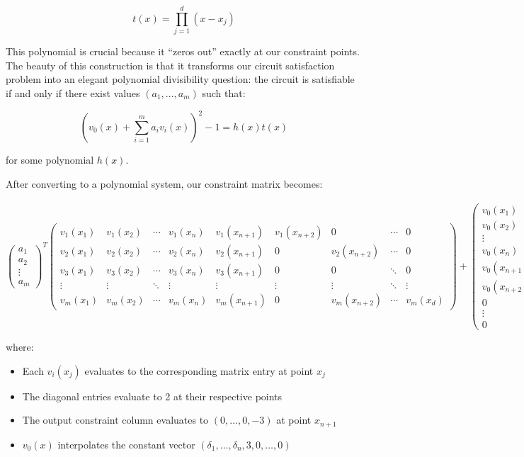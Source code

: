 \documentclass[12pt]{tufte-book}
\begin{document}
\[ t(x) = \prod_{j=1}^d (x-x_j) \]

This polynomial is crucial because it ``zeros out'' exactly at our constraint points. The beauty of this construction is that it transforms our circuit satisfaction problem into an elegant polynomial divisibility question: the circuit is satisfiable if and only if there exist values $(a_1,\ldots,a_m)$ such that:

\[ \left(v_0(x) + \sum_{i=1}^m a_i v_i(x)\right)^2 - 1 = h(x)t(x) \]

for some polynomial $h(x)$.

After converting to a polynomial system, our constraint matrix becomes:

\[ \begin{pmatrix} 
a_1 \\ 
a_2 \\ 
\vdots \\ 
a_m 
\end{pmatrix}^T
\begin{pmatrix}
v_1(x_1) & v_1(x_2) & \cdots & v_1(x_n) & v_1(x_{n+1}) & v_1(x_{n+2}) & 0 & \cdots & 0 \\
v_2(x_1) & v_2(x_2) & \cdots & v_2(x_n) & v_2(x_{n+1}) & 0 & v_2(x_{n+2}) & \cdots & 0 \\
v_3(x_1) & v_3(x_2) & \cdots & v_3(x_n) & v_3(x_{n+1}) & 0 & 0 & \ddots & 0 \\
\vdots & \vdots & \ddots & \vdots & \vdots & \vdots & \vdots & \ddots & \vdots \\
v_m(x_1) & v_m(x_2) & \cdots & v_m(x_n) & v_m(x_{n+1}) & 0 & v_m(x_{n+2}) & \cdots & v_m(x_d)
\end{pmatrix} + 
\begin{pmatrix} v_0(x_1) \\ v_0(x_2) \\ \vdots \\ v_0(x_n) \\ v_0(x_{n+1}) \\ v_0(x_{n+2}) \\ 0 \\ \vdots \\ 0 \end{pmatrix}^T \]

where:
\begin{itemize}
    \item Each $v_i(x_j)$ evaluates to the corresponding matrix entry at point $x_j$
    \item The diagonal entries evaluate to 2 at their respective points
    \item The output constraint column evaluates to $(0,\ldots,0,-3)$ at point $x_{n+1}$
    \item $v_0(x)$ interpolates the constant vector $(\delta_1,\ldots,\delta_n,3,0,\ldots,0)$
\end{itemize}
\end{document}
